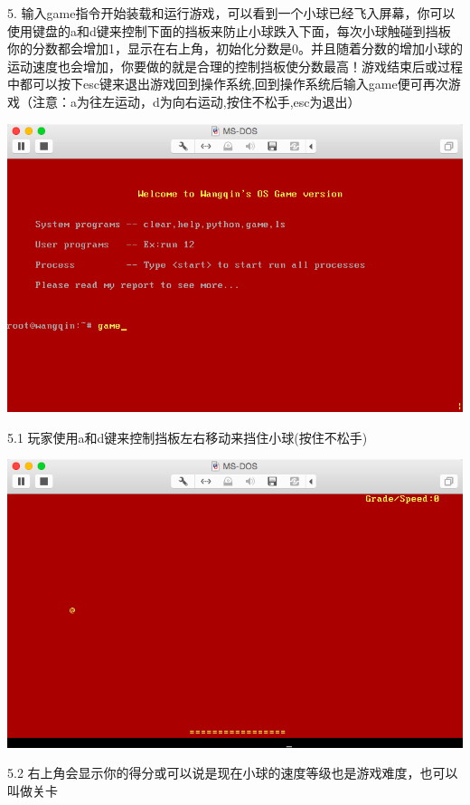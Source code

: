 \documentclass[a4paper]{article}
\begin{document}
{5. 输入game指令开始装载和运行游戏，可以看到一个小球已经飞入屏幕，你可以使用键盘的a和d键来控制下面的挡板来防止小球跌入下面，每次小球触碰到挡板你的分数都会增加1，显示在右上角，初始化分数是0。并且随着分数的增加小球的运动速度也会增加，你要做的就是合理的控制挡板使分数最高！游戏结束后或过程中都可以按下esc键来退出游戏回到操作系统,回到操作系统后输入game便可再次游戏{\scriptsize （注意：a为往左运动，d为向右运动,按住不松手,esc为退出）} 
  \begin{center} \includegraphics[scale=0.5]{Illustrations/start.png} \end{center}
  5.1 玩家使用a和d键来控制挡板左右移动来挡住小球{\scriptsize (按住不松手)}\\
  \begin{center} \includegraphics[scale=0.5]{Illustrations/gaming0.png} \end{center}
5.2 右上角会显示你的得分或可以说是现在小球的速度等级也是游戏难度，也可以叫做关卡\\
}
\end{document}
